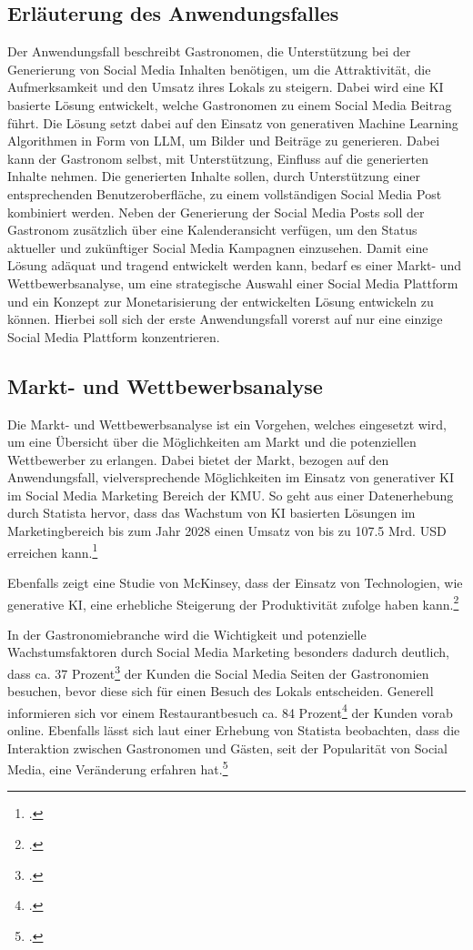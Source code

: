 \subsection{Erläuterung des Anwendungsfalles}
Der Anwendungsfall beschreibt Gastronomen, die Unterstützung bei der Generierung von Social Media Inhalten benötigen, um die Attraktivität, die Aufmerksamkeit und den Umsatz ihres Lokals zu steigern.
Dabei wird eine \ac{KI} basierte Lösung entwickelt, welche Gastronomen zu einem Social Media Beitrag führt.
Die Lösung setzt dabei auf den Einsatz von generativen Machine Learning Algorithmen in Form von \ac{LLM}, um Bilder und Beiträge zu generieren.
Dabei kann der Gastronom selbst, mit Unterstützung, Einfluss auf die generierten Inhalte nehmen.
Die generierten Inhalte sollen, durch Unterstützung einer entsprechenden Benutzeroberfläche, zu einem vollständigen Social Media Post kombiniert werden.
Neben der Generierung der Social Media Posts soll der Gastronom zusätzlich über eine Kalenderansicht verfügen, um den Status aktueller und zukünftiger Social Media Kampagnen einzusehen.
Damit eine Lösung adäquat und tragend entwickelt werden kann, bedarf es einer Markt- und Wettbewerbsanalyse, um eine strategische Auswahl einer Social Media Plattform und ein Konzept zur Monetarisierung der entwickelten Lösung entwickeln zu können.
Hierbei soll sich der erste Anwendungsfall vorerst auf nur eine einzige Social Media Plattform konzentrieren.

\subsection{Markt- und Wettbewerbsanalyse}
Die Markt- und Wettbewerbsanalyse ist ein Vorgehen, welches eingesetzt wird, um eine Übersicht über die Möglichkeiten am Markt und die potenziellen Wettbewerber zu erlangen.
Dabei bietet der Markt, bezogen auf den Anwendungsfall, vielversprechende Möglichkeiten im Einsatz von generativer \ac{KI} im Social Media Marketing Bereich der \ac{KMU}.
So geht aus einer Datenerhebung durch Statista hervor, dass das Wachstum von \ac{KI} basierten Lösungen im Marketingbereich bis zum Jahr 2028 einen Umsatz von bis zu 107.5 Mrd. USD erreichen kann.\footcite{statista_ai_marketing_europe}

Ebenfalls zeigt eine Studie von McKinsey, dass der Einsatz von Technologien, wie generative \ac{KI}, eine erhebliche Steigerung der Produktivität zufolge haben kann.\footcite{mckinsey_genai_marketing}

In der Gastronomiebranche wird die Wichtigkeit und potenzielle Wachstumsfaktoren durch Social Media Marketing besonders dadurch deutlich, dass ca. 37 Prozent\footcite{apicbase_gastro_fakten} der Kunden die Social Media Seiten der Gastronomien besuchen, bevor diese sich für einen Besuch des Lokals entscheiden.
Generell informieren sich vor einem Restaurantbesuch ca. 84 Prozent\footcite{g_wie_gastro_trends_2024} der Kunden vorab online.
Ebenfalls lässt sich laut einer Erhebung von Statista beobachten, dass die Interaktion zwischen Gastronomen und Gästen, seit der Popularität von Social Media, eine Veränderung erfahren hat.\footcite{statista_social_media_gastgewerbe}

